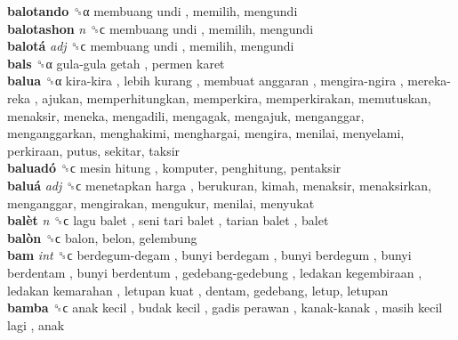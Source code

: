 \textbf{balotando} ␝α   membuang undi , memilih, mengundi  \\
\textbf{balotashon} \emph{n}  ␝ϲ   membuang undi , memilih, mengundi  \\
\textbf{balotá} \emph{adj}  ␝ϲ   membuang undi , memilih, mengundi  \\
\textbf{bals} ␝α   gula-gula getah ,  permen karet   \\
\textbf{balua} ␝α   kira-kira ,  lebih kurang ,  membuat anggaran ,  mengira-ngira ,  mereka-reka , ajukan, memperhitungkan, memperkira, memperkirakan, memutuskan, menaksir, meneka, mengadili, mengagak, mengajuk, menganggar, menganggarkan, menghakimi, menghargai, mengira, menilai, menyelami, perkiraan, putus, sekitar, taksir  \\
\textbf{baluadó} ␝ϲ   mesin hitung , komputer, penghitung, pentaksir  \\
\textbf{baluá} \emph{adj}  ␝ϲ   menetapkan harga , berukuran, kimah, menaksir, menaksirkan, menganggar, mengirakan, mengukur, menilai, menyukat  \\
\textbf{balèt} \emph{n}  ␝ϲ   lagu balet ,  seni tari balet ,  tarian balet , balet  \\
\textbf{balòn} ␝ϲ  balon, belon, gelembung  \\
\textbf{bam} \emph{int}  ␝ϲ   berdegum-degam ,  bunyi berdegam ,  bunyi berdegum ,  bunyi berdentam ,  bunyi berdentum ,  gedebang-gedebung ,  ledakan kegembiraan ,  ledakan kemarahan ,  letupan kuat , dentam, gedebang, letup, letupan  \\
\textbf{bamba} ␝ϲ   anak kecil ,  budak kecil ,  gadis perawan ,  kanak-kanak ,  masih kecil lagi , anak  \\
